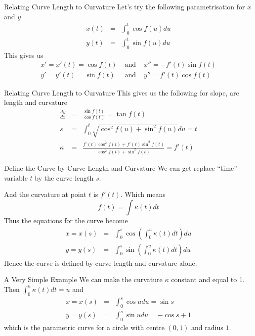 \documentclass{beamer}
\begin{document}
\begin{frame}{Relating Curve Length to Curvature}
	Let's try the following parametrisation for $x$ and $y$
	\begin{eqnarray*}
		x(t) &=& \int_{0}^{t} \cos f(u) du \\
		y(t) &=& \int_{0}^{t} \sin f(u) du
	\end{eqnarray*}
	This gives us
	\begin{eqnarray*}
		x' = x'(t) = \cos f(t) &\mbox{ and }& x''=-f'(t) \sin f(t) \\
		y' = y'(t) = \sin f(t) &\mbox{ and }& y''=f'(t) \cos f(t)
	\end{eqnarray*}
\end{frame}

\begin{frame}{Relating Curve Length to Curvature}
	This gives us the following for slope, arc length and curvature
	\begin{eqnarray*}
	\frac{dy}{dx} &=& \frac{\sin f(t)}{\cos f(t)} = \tan f(t) \\
 	s &=& \int_0^t \sqrt{\cos^2 f(u) + \sin^2 f(u)} du = t \\
 	\kappa &=& \frac{f'(t) \cos^2 f(t) + f'(t) \sin^2 f(t)}{\cos^2 f(t) + \sin^2 f(t)} = f'(t)
 \end{eqnarray*}
\end{frame}

\begin{frame}{Define the Curve by Curve Length and Curvature}
	We can get replace ``time'' variable $t$ by the curve length $s$.
	 
	And the curvature at point $t$ is $f'(t)$. Which means
	 \[
	 f(t) = \int \kappa(t) dt
	 \]
	Thus the equations for the curve become
	\begin{eqnarray*}
	x = x(s) &=& \int_{0}^{s} \cos \left( \int_0^u \kappa(t) dt \right) du \\
	y = y(s) &=& \int_{0}^{s} \sin \left( \int_0^u \kappa(t) dt \right) du
	\end{eqnarray*}
	Hence the curve is defined by curve length and curvature alone.
\end{frame}

\begin{frame}{A Very Simple Example}
	We can make the curvature $\kappa$ constant and equal to 1. Then 
	$ \int_0^u \kappa(t) dt = u $ and
	\begin{eqnarray*}
		x = x(s) &=& \int_{0}^{s} \cos u du = \sin s\\
		y = y(s) &=& \int_{0}^{s} \sin u du = - \cos s + 1
	\end{eqnarray*}
	which is the parametric curve for a circle with centre $(0, 1)$ and radius $1$.
	
\end{frame}
\end{document}
